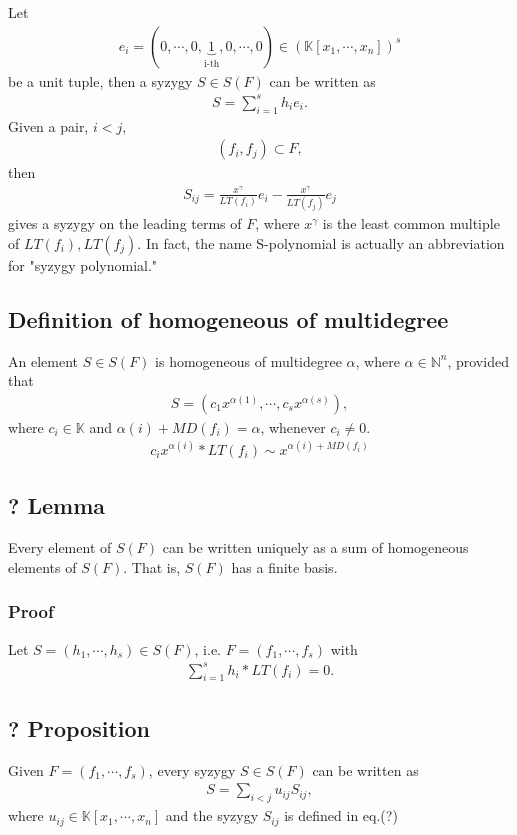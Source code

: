 \documentclass[11pt]{book}
\begin{document}
Let
\begin{eqnarray}
e_i = (0, \cdots, 0,\underbrace{1}_{\text{i-th}},0, \cdots, 0) \in (\mathbb{K}[x_1, \cdots, x_n])^s
\end{eqnarray}
be a unit tuple, then a syzygy $S \in S(F)$ can be written as
\begin{eqnarray}
S = \sum_{i=1}^s h_i e_i.
\end{eqnarray}
Given a pair, $i<j$,
\begin{eqnarray}
(f_i, f_j) \subset F,
\end{eqnarray}
then 
\begin{eqnarray}
S_{ij} =  \frac{x^\gamma}{LT(f_i)} e_i - \frac{x^\gamma}{LT(f_j)} e_j
\end{eqnarray}
gives a syzygy on the leading terms of $F$, where $x^\gamma$ is the least common multiple of $LT(f_i), LT(f_j)$.
In fact, the name S-polynomial is actually an abbreviation for "syzygy polynomial."

\subsection{Definition of homogeneous of multidegree}
An element $S \in S(F)$ is homogeneous of multidegree $\alpha$, where $\alpha \in \mathbb{N}^n$, provided that
\begin{eqnarray}
S = (c_1x^{\alpha(1)}, \cdots, c_sx^{\alpha(s)}),
\end{eqnarray}
where $c_i \in \mathbb{K}$ and $\alpha(i) + MD(f_i) = \alpha$, whenever $c_i \neq 0$.
\begin{eqnarray}
c_ix^{\alpha(i)} * LT(f_i) \sim x^{\alpha(i) + MD(f_i)}
\end{eqnarray}

\subsection{? Lemma}
Every element of $S(F)$ can be written uniquely as a sum of homogeneous elements of $S(F)$.
That is, $S(F)$ has a finite basis.

\subsubsection{Proof}
Let $S = (h_1, \cdots, h_s) \in S(F)$, i.e. $F = (f_1, \cdots, f_s)$ with
\begin{eqnarray}
\sum_{i=1}^s h_i * LT(f_i) = 0.
\end{eqnarray}


\subsection{? Proposition}
Given $F = (f_1, \cdots, f_s)$, every syzygy $S \in S(F)$ can be written as
\begin{eqnarray}
S = \sum_{i<j} u_{ij} S_{ij},
\end{eqnarray}
where $u_{ij} \in \mathbb{K}[x_1, \cdots, x_n]$ and the syzygy $S_{ij}$ is defined in eq.(?)
\end{document}
